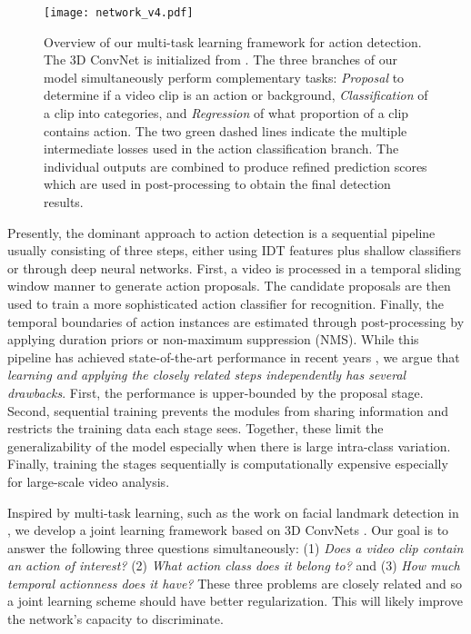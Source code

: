 \documentclass[10pt,twocolumn,letterpaper]{article}
\begin{document}
\begin{figure*}[t]
	\centering
	\texttt{[image: network\_v4.pdf]}
	\vspace{-46ex}
	\caption{Overview of our multi-task learning framework for action detection. The 3D ConvNet is initialized from \cite{c3d2015}. The three branches of our model simultaneously perform complementary tasks: \textit{Proposal} to determine if a video clip is an action or background, \textit{Classification} of a clip into categories, and \textit{Regression} of what proportion of a clip contains action. The two green dashed lines indicate the multiple intermediate losses used in the action classification branch. The individual outputs are combined to produce refined prediction scores which are used in post-processing to obtain the final detection results.}
	\label{fig:modelConfigure}
	\vspace{-1ex}
\end{figure*}

Presently, the dominant approach to action detection \cite{fast_temporal_action_proposal_fabian_cvpr16,tubelets_cvpr14_jain,yu_FAP_cvpr15,scnn_shou_wang_chang_cvpr16} is a sequential pipeline usually consisting of three steps, either using IDT features plus shallow classifiers or through deep neural networks. First, a video is processed in a temporal sliding window manner to generate action proposals. The candidate proposals are then used to train a more sophisticated action classifier for recognition. Finally, the temporal boundaries of action instances are estimated through post-processing by applying duration priors or non-maximum suppression (NMS). 
While this pipeline has achieved state-of-the-art performance in recent years \cite{learThumos2014,motion_appearance_thumos_wang14,florence_thumos2014,adsc_thumos_15}, we argue that \textit{learning and applying the closely related steps independently has several drawbacks}. First, the performance is upper-bounded by the proposal stage. Second, sequential training prevents the modules from sharing information and restricts the training data each stage sees. Together, these limit the generalizability of the model especially when there is large intra-class variation. Finally, training the stages sequentially is computationally expensive especially for large-scale video analysis.

Inspired by multi-task learning, such as the work on facial landmark detection in \cite{multi_task_face_zhang_eccv14}, we develop a joint learning framework based on 3D ConvNets \cite{c3d2015}. Our goal is to answer the following three questions simultaneously: (1) \textit{Does a video clip contain an action of interest?} (2) \textit{What action class does it belong to?} and (3) \textit{How much temporal actionness does it have?} 
These three problems are closely related and so a joint learning scheme should have better regularization. This will likely improve the network's capacity to discriminate.
\end{document}
